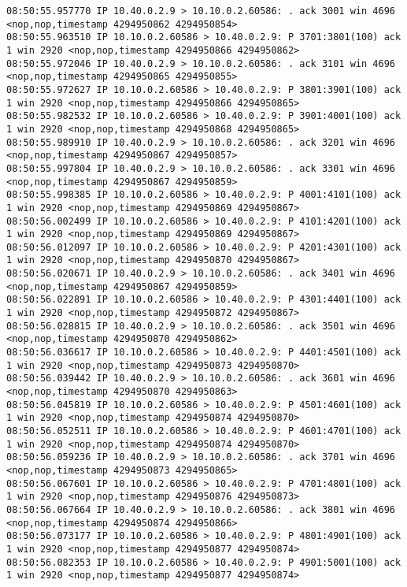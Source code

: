 \documentclass[a4paper,12pt]{article}
\begin{document}
\begin{Verbatim}
08:50:55.957770 IP 10.40.0.2.9 > 10.10.0.2.60586: . ack 3001 win 4696 <nop,nop,timestamp 4294950862 4294950854>
08:50:55.963510 IP 10.10.0.2.60586 > 10.40.0.2.9: P 3701:3801(100) ack 1 win 2920 <nop,nop,timestamp 4294950866 4294950862>
08:50:55.972046 IP 10.40.0.2.9 > 10.10.0.2.60586: . ack 3101 win 4696 <nop,nop,timestamp 4294950865 4294950855>
08:50:55.972627 IP 10.10.0.2.60586 > 10.40.0.2.9: P 3801:3901(100) ack 1 win 2920 <nop,nop,timestamp 4294950866 4294950865>
08:50:55.982532 IP 10.10.0.2.60586 > 10.40.0.2.9: P 3901:4001(100) ack 1 win 2920 <nop,nop,timestamp 4294950868 4294950865>
08:50:55.989910 IP 10.40.0.2.9 > 10.10.0.2.60586: . ack 3201 win 4696 <nop,nop,timestamp 4294950867 4294950857>
08:50:55.997804 IP 10.40.0.2.9 > 10.10.0.2.60586: . ack 3301 win 4696 <nop,nop,timestamp 4294950867 4294950859>
08:50:55.998385 IP 10.10.0.2.60586 > 10.40.0.2.9: P 4001:4101(100) ack 1 win 2920 <nop,nop,timestamp 4294950869 4294950867>
08:50:56.002499 IP 10.10.0.2.60586 > 10.40.0.2.9: P 4101:4201(100) ack 1 win 2920 <nop,nop,timestamp 4294950869 4294950867>
08:50:56.012097 IP 10.10.0.2.60586 > 10.40.0.2.9: P 4201:4301(100) ack 1 win 2920 <nop,nop,timestamp 4294950870 4294950867>
08:50:56.020671 IP 10.40.0.2.9 > 10.10.0.2.60586: . ack 3401 win 4696 <nop,nop,timestamp 4294950867 4294950859>
08:50:56.022891 IP 10.10.0.2.60586 > 10.40.0.2.9: P 4301:4401(100) ack 1 win 2920 <nop,nop,timestamp 4294950872 4294950867>
08:50:56.028815 IP 10.40.0.2.9 > 10.10.0.2.60586: . ack 3501 win 4696 <nop,nop,timestamp 4294950870 4294950862>
08:50:56.036617 IP 10.10.0.2.60586 > 10.40.0.2.9: P 4401:4501(100) ack 1 win 2920 <nop,nop,timestamp 4294950873 4294950870>
08:50:56.039442 IP 10.40.0.2.9 > 10.10.0.2.60586: . ack 3601 win 4696 <nop,nop,timestamp 4294950870 4294950863>
08:50:56.045819 IP 10.10.0.2.60586 > 10.40.0.2.9: P 4501:4601(100) ack 1 win 2920 <nop,nop,timestamp 4294950874 4294950870>
08:50:56.052511 IP 10.10.0.2.60586 > 10.40.0.2.9: P 4601:4701(100) ack 1 win 2920 <nop,nop,timestamp 4294950874 4294950870>
08:50:56.059236 IP 10.40.0.2.9 > 10.10.0.2.60586: . ack 3701 win 4696 <nop,nop,timestamp 4294950873 4294950865>
08:50:56.067601 IP 10.10.0.2.60586 > 10.40.0.2.9: P 4701:4801(100) ack 1 win 2920 <nop,nop,timestamp 4294950876 4294950873>
08:50:56.067664 IP 10.40.0.2.9 > 10.10.0.2.60586: . ack 3801 win 4696 <nop,nop,timestamp 4294950874 4294950866>
08:50:56.073177 IP 10.10.0.2.60586 > 10.40.0.2.9: P 4801:4901(100) ack 1 win 2920 <nop,nop,timestamp 4294950877 4294950874>
08:50:56.082353 IP 10.10.0.2.60586 > 10.40.0.2.9: P 4901:5001(100) ack 1 win 2920 <nop,nop,timestamp 4294950877 4294950874>

\end{Verbatim}
\end{document}
